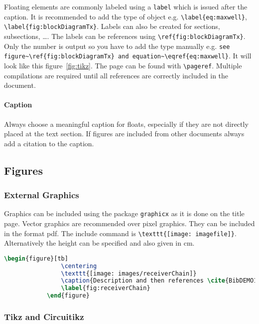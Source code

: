		Floating elements are commonly labeled using a \texttt{label} which is issued after the caption. It is recommended to add the type of object e.g. \verb|\label{eq:maxwell}|, \verb|\label{fig:blockDiagramTx}|. Labels can also be created for sections, subsections, \dots.
		The labels can be references using \verb|\ref{fig:blockDiagramTx}|. Only the number is output so you have to add the type manually e.g. \verb|see figure~\ref{fig:blockDiagramTx} and equation~\eqref{eq:maxwell}|. It will look like this figure~\ref{fig:tikz}. The page can be found with \verb|\pageref|. Multiple compilations are required until all references are correctly included in the document.
		
		\paragraph{Caption}
		
		Always choose a meaningful caption for floats, especially if they are not directly placed at the text section. If figures are included from other documents always add a citation to the caption.
	
	\subsection{Figures}
	\label{sec:figures}
	
		\subsubsection{External Graphics}
			
		Graphics can be included using the package \texttt{graphicx} as it is done on the title page. Vector graphics are recommended over pixel graphics. They can be included in the format pdf. The include command is \verb|\texttt{[image: imagefile]}|. Alternatively the height can be specified and also given in cm.
		
		\begin{lstlisting}[language=TeX]
			\begin{figure}[tb]
				\centering
				\texttt{[image: images/receiverChain]}
				\caption{Description and then references \cite{BibDEMO1, BibDEMO2, BibDEMO3}}
				\label{fig:receiverChain}
			\end{figure}
		\end{lstlisting}
	
		\subsubsection{Tikz and Circuitikz}
		
